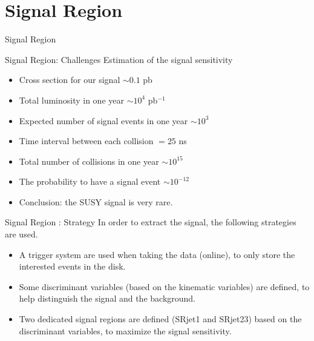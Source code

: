 \documentclass[mathserif,serif]{beamer}
\begin{document}
\section{Signal Region}
\begin{frame}
\begin{center}
\huge
Signal Region
\end{center}
\end{frame}

\begin{frame}{Signal Region: Challenges}
Estimation of the signal sensitivity
\begin{itemize}
\item Cross section for our signal $\sim 0.1$ pb
\item Total luminosity in one year $\sim 10^4$ pb$^{-1}$
\item Expected number of signal events in one year $\sim 10^3$
\end{itemize}
\begin{itemize}
\item Time interval between each collision $= 25$ ns
\item Total number of collisions in one year $\sim 10^{15}$
\item The probability to have a signal event $\sim 10^{-12}$
\item Conclusion: the SUSY signal is very rare.
\end{itemize}
\end{frame}

\begin{frame}{Signal Region : Strategy}
In order to extract the signal, the following strategies are used.
\begin{itemize}
\item A trigger system are used when taking the data (online), to only store the interested events in the disk.
\item Some discriminant variables (based on the kinematic variables) are defined, to help distinguish the signal and the background.
\item Two dedicated signal regions are defined (SRjet1 and SRjet23) based on the discriminant variables, to maximize the signal sensitivity.
\end{itemize}
\end{frame}
\end{document}
